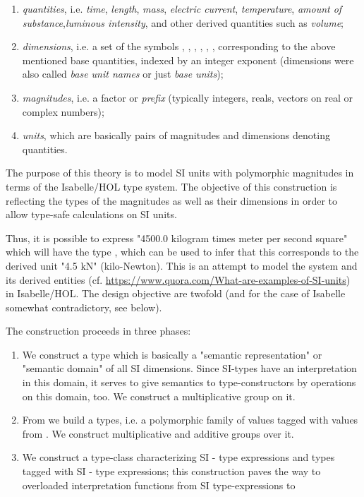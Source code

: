 \documentclass[11pt,a4paper]{book}
\begin{document}
%
\begin{enumerate}%
\item \emph{quantities}, i.e. \emph{time}, \emph{length}, \emph{mass}, \emph{electric current},
\emph{temperature}, \emph{amount of substance},\emph{luminous intensity},
and other derived quantities such as \emph{volume};

\item \emph{dimensions}, i.e. a set of the symbols  , , , ,  \isa{{\isasymTheta}}, ,   corresponding
to the above mentioned base quantities,  indexed by an integer exponent
(dimensions were also called \emph{base unit names} or just \emph{base units});

\item \emph{magnitudes}, i.e. a factor or \emph{prefix}
(typically integers, reals, vectors on real or complex numbers);

\item \emph{units}, which are basically pairs of magnitudes and dimensions denoting quantities.
\end{enumerate}


The purpose of this theory is to model SI units with polymorphic magnitudes in terms of the
Isabelle/HOL type system. The objective of this construction is reflecting the types of the
magnitudes as well as their dimensions in order to allow type-safe calculations on SI units.

Thus, it is possible to express "4500.0 kilogram times meter per second square" which will
have the type , which can be used to infer that this corresponds to the derived
unit "4.5 kN" (kilo-Newton).  %
%
This is an attempt to model the system and its derived entities (cf.
\url{https://www.quora.com/What-are-examples-of-SI-units}) in Isabelle/HOL.
The design objective are twofold (and for the case of Isabelle somewhat
contradictory, see below).

The construction proceeds in three phases:

\begin{enumerate}%
\item We construct a type  which is basically a "semantic representation" or
"semantic domain" of all SI dimensions. Since SI-types have an interpretation in this domain,
it serves to give semantics to type-constructors by operations on this domain, too.
We construct a multiplicative group on it.

\item From  we build a   types, i.e. a polymorphic family of values
tagged with values from . We construct multiplicative and additive
groups over it.

\item We construct a type-class characterizing SI - type expressions
and types tagged with SI - type expressions; this construction paves the
way to overloaded interpretation functions from SI type-expressions to

\end{enumerate}%
\end{document}
